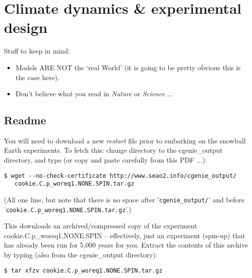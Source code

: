 
\cleardoublepage


\chapter{Climate dynamics \& experimental design}\label{ch:climate-dynamics}

\hfill \break

\noindent Stuff to keep in mind:

\vspace{2mm}
\begin{itemize}
\item Models ARE NOT the ‘real World’ (it is going to be pretty obvious this is the case here).
\item Don’t believe what you read in \textit{Nature} or \textit{Science} ...
\end{itemize}

\newpage

\section*{Readme}

You will need to download a new \textit{restart} file prior to embarking on the snowball Earth experiments.
To fetch this: change directory to the \textsf{\footnotesize cgenie\_output} directory, and type (or copy and paste carefully from this PDF ...):
\vspace{-2mm}
\small\begin{verbatim}
$ wget --no-check-certificate http://www.seao2.info/cgenie_output/
   cookie.C.p_woreq1.NONE.SPIN.tar.gz
\end{verbatim}\normalsize
\vspace{-2mm}
(All one line, but note that there is no space after '\texttt{cgenie\_output/}' and before
\\'\texttt{cookie.C.p\_woreq1.NONE.SPIN.tar.gz}'.)

\vspace{1mm}
This downloads an archived/compressed copy of the experiment \textsf{\footnotesize cookie.C.p\_woreq1.NONE.SPIN} – effectively, just an experiment (spin-up) that has already been run for 5,000 years for you. Extract the contents of this archive by typing (also from the \textsf{\footnotesize cgenie\_output} directory):
\vspace{-2mm}
\small\begin{verbatim}
$ tar xfzv cookie.C.p_woreq1.NONE.SPIN.tar.gz
\end{verbatim}\normalsize
\vspace{-2mm}

